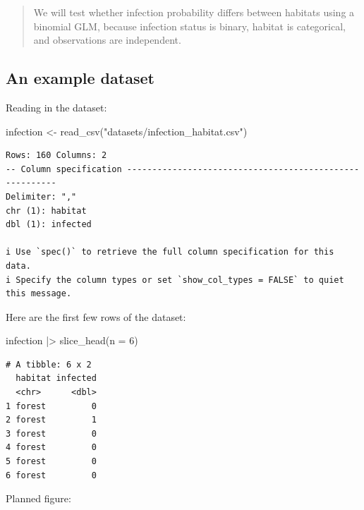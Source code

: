 \documentclass[
  letterpaper,
  8pt,
  a4paper]{book}
\newenvironment{Shaded}{\begin{snugshade}}{\end{snugshade}}
\newcommand{\AttributeTok}[1]{\textcolor[rgb]{0.40,0.45,0.13}{#1}}
\newcommand{\DecValTok}[1]{\textcolor[rgb]{0.68,0.00,0.00}{#1}}
\newcommand{\FunctionTok}[1]{\textcolor[rgb]{0.28,0.35,0.67}{#1}}
\newcommand{\NormalTok}[1]{\textcolor[rgb]{0.00,0.23,0.31}{#1}}
\newcommand{\OtherTok}[1]{\textcolor[rgb]{0.00,0.23,0.31}{#1}}
\newcommand{\SpecialCharTok}[1]{\textcolor[rgb]{0.37,0.37,0.37}{#1}}
\newcommand{\StringTok}[1]{\textcolor[rgb]{0.13,0.47,0.30}{#1}}
\begin{document}
\begin{quote}
We will test whether infection probability differs between habitats
using a binomial GLM, because infection status is binary, habitat is
categorical, and observations are independent.
\end{quote}

\subsection*{An example dataset}\label{an-example-dataset-3}

Reading in the dataset:

\begin{Shaded}
\begin{Highlighting}[]
\NormalTok{infection }\OtherTok{\textless{}{-}} \FunctionTok{read\_csv}\NormalTok{(}\StringTok{"datasets/infection\_habitat.csv"}\NormalTok{)}
\end{Highlighting}
\end{Shaded}

\begin{verbatim}
Rows: 160 Columns: 2
-- Column specification --------------------------------------------------------
Delimiter: ","
chr (1): habitat
dbl (1): infected

i Use `spec()` to retrieve the full column specification for this data.
i Specify the column types or set `show_col_types = FALSE` to quiet this message.
\end{verbatim}

Here are the first few rows of the dataset:

\begin{Shaded}
\begin{Highlighting}[]
\NormalTok{infection }\SpecialCharTok{|\textgreater{}} 
  \FunctionTok{slice\_head}\NormalTok{(}\AttributeTok{n =} \DecValTok{6}\NormalTok{)}
\end{Highlighting}
\end{Shaded}

\begin{verbatim}
# A tibble: 6 x 2
  habitat infected
  <chr>      <dbl>
1 forest         0
2 forest         1
3 forest         0
4 forest         0
5 forest         0
6 forest         0
\end{verbatim}

Planned figure:
\end{document}
